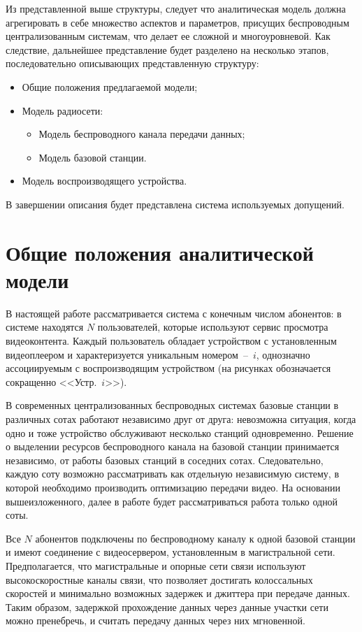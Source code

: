 Из представленной выше структуры, следует что аналитическая модель должна агрегировать в себе множество аспектов и параметров, присущих беспроводным централизованным системам, что делает ее сложной и многоуровневой. Как следствие, дальнейшее представление будет разделено на несколько этапов, последовательно описывающих представленную структуру:
\begin{itemize}
  \item Общие положения предлагаемой модели;
  \item Модель радиосети:
  \begin{itemize}
  	\item Модель беспроводного канала передачи данных;
  	\item Модель базовой станции.
  \end{itemize}
  \item Модель воспроизводящего устройства.
\end{itemize}
В завершении описания будет представлена система используемых допущений.

\section{Общие положения аналитической модели}
\label{chap2:GeneralOverview}

В настоящей работе рассматривается система с конечным числом абонентов: в системе находятся $N$ пользователей, которые используют сервис просмотра видеоконтента. Каждый пользователь обладает устройством с установленным видеоплеером и характеризуется уникальным номером~--~$i$, однозначно ассоциируемым с воспроизводящим устройством (на рисунках обозначается сокращенно <<Устр.~$i$>>).

В современных централизованных беспроводных системах базовые станции в различных сотах работают независимо друг от друга: невозможна ситуация, когда одно и тоже устройство обслуживают несколько станций одновременно. Решение о выделении ресурсов беспроводного канала на базовой станции принимается независимо, от работы базовых станций в соседних сотах. Следовательно, каждую соту возможно рассматривать как отдельную независимую систему, в которой необходимо производить оптимизацию передачи видео. На основании вышеизложенного, далее в работе будет рассматриваться работа только одной соты.

Все $N$ абонентов подключены по беспроводному каналу к одной базовой станции и имеют соединение с видеосервером, установленным в магистральной сети. Предполагается, что магистральные и опорные сети связи используют высокоскоростные каналы связи, что позволяет достигать колоссальных скоростей и минимально возможных задержек и джиттера при передаче данных. Таким образом, задержкой прохождение данных через данные участки сети можно пренебречь, и считать передачу данных через них мгновенной.

